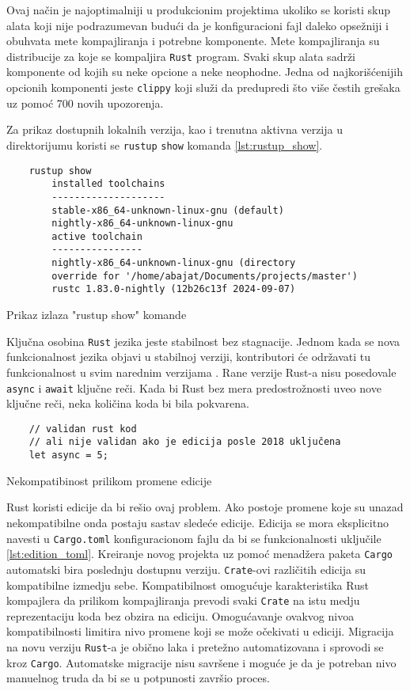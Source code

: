 Ovaj način je najoptimalniji u produkcionim projektima ukoliko se koristi skup alata koji 
nije podrazumevan budući da je konfiguracioni fajl daleko opsežniji i obuhvata mete kompajliranja i 
potrebne komponente. Mete kompajliranja su distribucije za koje se kompaljira \verb|Rust| program.
Svaki skup alata sadrži komponente od kojih su neke opcione a neke neophodne. Jedna od najkorišćenijih 
opcionih komponenti jeste \verb|clippy| koji služi da predupredi što više čestih grešaka uz pomoć 
700 novih upozorenja. 


Za prikaz dostupnih lokalnih verzija, kao i trenutna aktivna verzija u direktorijumu koristi se \verb|rustup|
\verb|show| komanda \ref{lst:rustup_show}.

\begin{listing}[H]
\begin{verbatim}
    rustup show
        installed toolchains
        --------------------
        stable-x86_64-unknown-linux-gnu (default)
        nightly-x86_64-unknown-linux-gnu
        active toolchain
        ----------------
        nightly-x86_64-unknown-linux-gnu (directory 
        override for '/home/abajat/Documents/projects/master')
        rustc 1.83.0-nightly (12b26c13f 2024-09-07)
\end{verbatim}
\caption{Prikaz izlaza "rustup show" komande}
\label{lst:rustup_show}
\end{listing}

Ključna osobina \verb|Rust| jezika jeste stabilnost bez stagnacije. Jednom kada se nova 
funkcionalnost jezika objavi u stabilnoj verziji, kontributori će održavati 
tu funkcionalnost u svim narednim verzijama \cite{editions}.
Rane verzije Rust-a nisu posedovale \verb|async| i \verb|await| ključne reči.
Kada bi Rust bez mera predostrožnosti uveo nove ključne reči, neka količina koda bi bila pokvarena.

\begin{listing}[h]
\begin{verbatim}
    // validan rust kod 
    // ali nije validan ako je edicija posle 2018 uključena
    let async = 5; 
\end{verbatim}
\caption{Nekompatibinost prilikom promene edicije}
\label{lst:edition}
\end{listing}


Rust koristi edicije da bi rešio ovaj problem. Ako postoje promene koje su unazad 
nekompatibilne onda postaju sastav sledeće edicije. Edicija se mora eksplicitno navesti 
u \verb|Cargo.toml| konfiguracionom fajlu da bi se funkcionalnosti uključile \ref{lst:edition_toml}. Kreiranje novog projekta uz 
pomoć menadžera paketa \verb|Cargo| automatski bira poslednju dostupnu verziju.
\verb|Crate|-ovi različitih edicija su kompatibilne izmedju sebe. Kompatibilnost omogućuje 
karakteristika Rust kompajlera da prilikom kompajliranja prevodi svaki \verb|Crate| na istu medju reprezentaciju 
koda bez obzira na ediciju. Omogućavanje ovakvog nivoa kompatibilnosti limitira nivo promene 
koji se može očekivati u ediciji. Migracija na novu verziju \verb|Rust|-a je obično laka i pretežno automatizovana
i sprovodi se kroz \verb|Cargo|. Automatske migracije nisu savršene i moguće je da je potreban nivo manuelnog 
truda da bi se u potpunosti završio proces.

